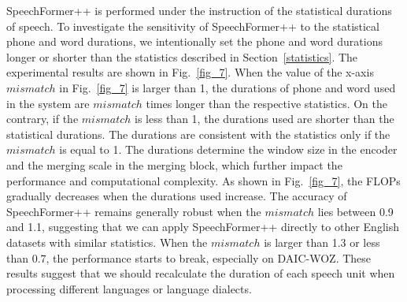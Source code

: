 \documentclass[lettersize,journal]{IEEEtran}
\begin{document}
SpeechFormer++ is performed under the instruction of the statistical durations of speech. To investigate the sensitivity of SpeechFormer++ to the statistical phone and word durations, we intentionally set the phone and word durations longer or shorter than the statistics described in Section~\ref{statistics}. The experimental results are shown in Fig.~\ref{fig_7}. When the value of the x-axis $mismatch$ in Fig.~\ref{fig_7} is larger than 1, the durations of phone and word used in the system are $mismatch$ times longer than the respective statistics. On the contrary, if the $mismatch$ is less than 1, the durations used are shorter than the statistical durations. The durations are consistent with the statistics only if the $mismatch$ is equal to 1. The durations determine the window size in the encoder and the merging scale in the merging block, which further impact the performance and computational complexity. As shown in Fig.~\ref{fig_7}, the FLOPs gradually decreases when the durations used increase. The accuracy of SpeechFormer++ remains generally robust when the $mismatch$ lies between 0.9 and 1.1, suggesting that we can apply SpeechFormer++ directly to other English datasets with similar statistics. When the $mismatch$ is larger than 1.3 or less than 0.7, the performance starts to break, especially on DAIC-WOZ. These results suggest that we should recalculate the duration of each speech unit when processing different languages or language dialects.
\end{document}
